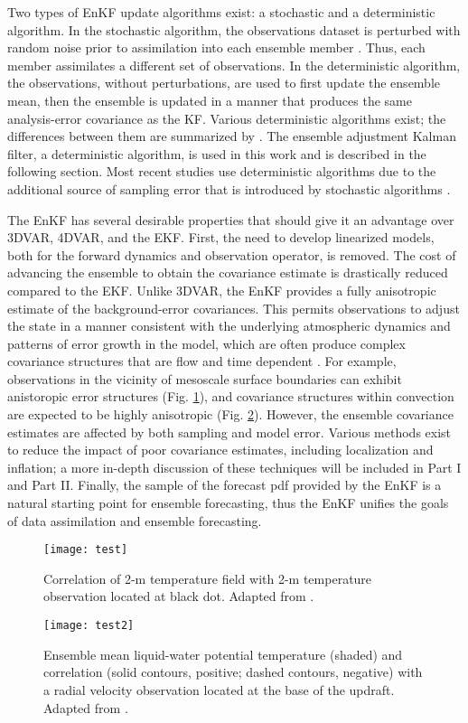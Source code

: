 Two types of EnKF update algorithms exist: a stochastic and a deterministic algorithm. In the stochastic algorithm, the observations dataset is perturbed with random noise prior to assimilation into each ensemble member \citep{houtekamermitchell98,hamillsnyder02}. Thus, each member assimilates a different set of observations. In the deterministic algorithm, the observations, without perturbations, are used to first update the ensemble mean, then the ensemble is updated in a manner that produces the same analysis-error covariance as the KF. Various deterministic algorithms exist; the differences between them are summarized by \citet{tippett03}. The ensemble adjustment Kalman filter, a deterministic algorithm, is used in this work and is described in the following section. Most recent studies use deterministic algorithms due to the additional source of sampling error that is introduced by stochastic algorithms \citep{whitakerhamill02}.

The EnKF has several desirable properties that should give it an advantage over 3DVAR, 4DVAR, and the EKF. First, the need to develop linearized models, both for the forward dynamics and observation operator, is removed. The cost of advancing the ensemble to obtain the covariance estimate is drastically reduced compared to the EKF. Unlike 3DVAR, the EnKF provides a fully anisotropic estimate of the background-error covariances. This permits observations to adjust the state in a manner consistent with the underlying atmospheric dynamics and patterns of error growth in the model, which are often produce complex covariance structures that are flow and time dependent \citep{bouttier94}. For example, observations in the vicinity of mesoscale surface boundaries can exhibit anistoropic error structures (Fig. \ref{cov1}), and covariance structures within convection are expected to be highly anisotropic (Fig. \ref{cov2}). However, the ensemble covariance estimates are affected by both sampling and model error. Various methods exist to reduce the impact of poor covariance estimates, including localization and inflation; a more in-depth discussion of these techniques will be included in Part I and Part II. Finally, the sample of the forecast pdf provided by the EnKF is a natural starting point for ensemble forecasting, thus the EnKF unifies the goals of data assimilation and ensemble forecasting.

\begin{figure}
\centering
\texttt{[image: test]}
\caption{Correlation of 2-m temperature field with 2-m temperature observation located at black dot. Adapted from \citet{knopfmeierstensrud13}. }
\label{cov1}
\end{figure}
\begin{figure}
\centering
\texttt{[image: test2]}
\caption{Ensemble mean liquid-water potential temperature (shaded) and correlation (solid contours, positive; dashed contours, negative) with a radial velocity observation located at the base of the updraft. Adapted from \citet{snyderzhang03}. }
\label{cov2}
\end{figure}

